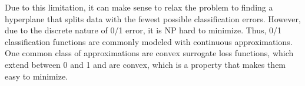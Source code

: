 \documentclass[12pt,titlepage]{article}
\begin{document}
      Due to this limitation, it can make sense to relax the problem to finding a hyperplane that splits data with the fewest possible classification errors. However, due to
      the discrete nature of 0/1 error, it is NP hard to minimize. Thus, 0/1 classification functions are commonly modeled with continuous approximations. One common class
      of approximations are convex surrogate loss functions, which extend between 0 and 1 and are convex, which is a property that makes them easy to minimize.
\end{document}
